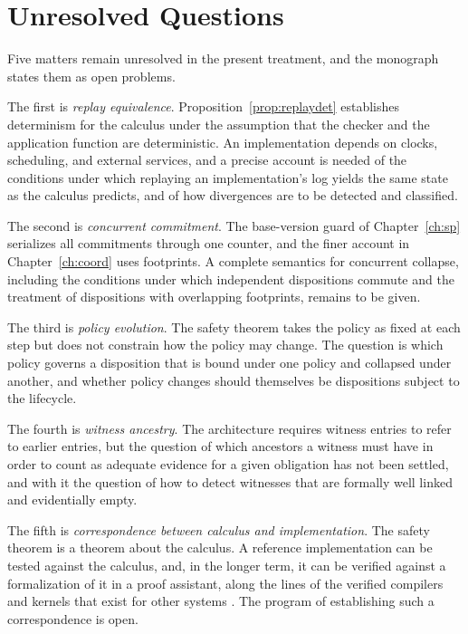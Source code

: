 \documentclass[11pt,twoside,openright]{book}
\theoremstyle{plain}
\theoremstyle{definition}
\theoremstyle{remark}
\begin{document}
\section{Unresolved Questions}

Five matters remain unresolved in the present treatment, and the monograph states them as open problems.

The first is \emph{replay equivalence}. Proposition~\ref{prop:replaydet} establishes determinism for the calculus under the assumption that the checker and the application function are deterministic. An implementation depends on clocks, scheduling, and external services, and a precise account is needed of the conditions under which replaying an implementation's log yields the same state as the calculus predicts, and of how divergences are to be detected and classified.

The second is \emph{concurrent commitment}. The base-version guard of Chapter~\ref{ch:sp} serializes all commitments through one counter, and the finer account in Chapter~\ref{ch:coord} uses footprints. A complete semantics for concurrent collapse, including the conditions under which independent dispositions commute and the treatment of dispositions with overlapping footprints, remains to be given.

The third is \emph{policy evolution}. The safety theorem takes the policy as fixed at each step but does not constrain how the policy may change. The question is which policy governs a disposition that is bound under one policy and collapsed under another, and whether policy changes should themselves be dispositions subject to the lifecycle.

The fourth is \emph{witness ancestry}. The architecture requires witness entries to refer to earlier entries, but the question of which ancestors a witness must have in order to count as adequate evidence for a given obligation has not been settled, and with it the question of how to detect witnesses that are formally well linked and evidentially empty.

The fifth is \emph{correspondence between calculus and implementation}. The safety theorem is a theorem about the calculus. A reference implementation can be tested against the calculus, and, in the longer term, it can be verified against a formalization of it in a proof assistant, along the lines of the verified compilers and kernels that exist for other systems \cite{leroy2009,klein2009}. The program of establishing such a correspondence is open.
\end{document}
